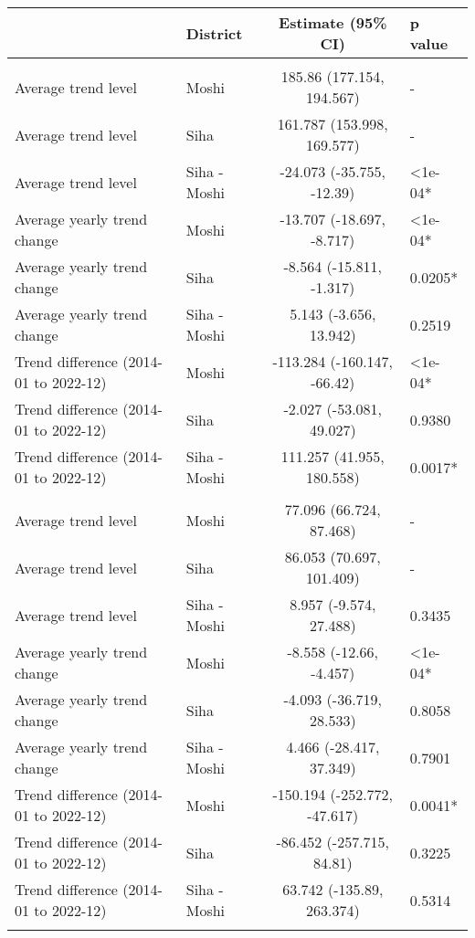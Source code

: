 \begin{longtable}{l|lcl}
\toprule
\multicolumn{1}{l}{} & District & Estimate (95\% CI) & p value \\ 
\midrule\addlinespace[2.5pt]
\multicolumn{4}{l}{Chronic Respiratory Disease} \\ 
\midrule\addlinespace[2.5pt]
Average trend level & Moshi & 185.86 (177.154, 194.567) & - \\ 
Average trend level & Siha & 161.787 (153.998, 169.577) & - \\ 
Average trend level & Siha - Moshi & -24.073 (-35.755, -12.39) & <1e-04* \\ 
Average yearly trend change & Moshi & -13.707 (-18.697, -8.717) & <1e-04* \\ 
Average yearly trend change & Siha & -8.564 (-15.811, -1.317) & 0.0205* \\ 
Average yearly trend change & Siha - Moshi & 5.143 (-3.656, 13.942) & 0.2519 \\ 
Trend difference (2014-01 to 2022-12) & Moshi & -113.284 (-160.147, -66.42) & <1e-04* \\ 
Trend difference (2014-01 to 2022-12) & Siha & -2.027 (-53.081, 49.027) & 0.9380 \\ 
Trend difference (2014-01 to 2022-12) & Siha - Moshi & 111.257 (41.955, 180.558) & 0.0017* \\ 
\midrule\addlinespace[2.5pt]
\multicolumn{4}{l}{Caries} \\ 
\midrule\addlinespace[2.5pt]
Average trend level & Moshi & 77.096 (66.724, 87.468) & - \\ 
Average trend level & Siha & 86.053 (70.697, 101.409) & - \\ 
Average trend level & Siha - Moshi & 8.957 (-9.574, 27.488) & 0.3435 \\ 
Average yearly trend change & Moshi & -8.558 (-12.66, -4.457) & <1e-04* \\ 
Average yearly trend change & Siha & -4.093 (-36.719, 28.533) & 0.8058 \\ 
Average yearly trend change & Siha - Moshi & 4.466 (-28.417, 37.349) & 0.7901 \\ 
Trend difference (2014-01 to 2022-12) & Moshi & -150.194 (-252.772, -47.617) & 0.0041* \\ 
Trend difference (2014-01 to 2022-12) & Siha & -86.452 (-257.715, 84.81) & 0.3225 \\ 
Trend difference (2014-01 to 2022-12) & Siha - Moshi & 63.742 (-135.89, 263.374) & 0.5314 \\ 
\midrule\addlinespace[2.5pt]

\end{longtable}

